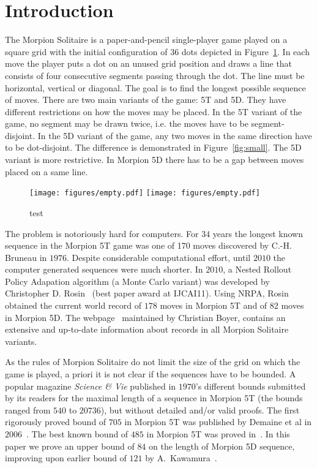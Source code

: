 \documentclass[a4paper,UKenglish]{lipics}
\begin{document}
\section{Introduction}
The Morpion Solitaire is a paper-and-pencil single-player game played on a square grid with 
  the initial configuration of 36 dots depicted in Figure~\ref{fig:initial}. 
In each move the player puts a dot on an unused grid position and draws a line that 
  consists of four consecutive segments passing through the dot. 
The line must be horizontal, vertical or diagonal. 
The goal is to find the longest possible sequence of moves.
There are two main variants of the game: 5T and 5D. 
They have different restrictions on how the moves may be placed.
In the 5T variant of the game, no segment may be drawn twice, i.e. the moves have to be segment-disjoint. 
In the 5D variant of the game, any two moves in the same direction have to be dot-disjoint.
The difference is demonstrated in Figure~\ref{fig:small}.
The 5D variant is more restrictive. In Morpion 5D there has to be a gap between moves
  placed on a same line.


  \begin{figure}
    \centering
      \texttt{[image: figures/empty.pdf]}
      \texttt{[image: figures/empty.pdf]}
      \caption{\label{fig:initial}
	test
      }
\end{figure}

The problem is notoriously hard for computers. 
For $34$ years the longest known sequence in the Morpion 5T game
  was one of 170 moves discovered by C.-H. Bruneau in $1976$. 
Despite considerable computational effort, until $2010$ the computer generated
  sequences were much shorter.
In $2010$, a Nested Rollout Policy Adapation algorithm (a Monte Carlo variant) 
  was developed by Christopher D. Rosin~\cite{rosin} (best paper award at IJCAI11).
Using NRPA, Rosin obtained the current world record of $178$ moves in Morpion 5T 
  and of $82$ moves in Morpion 5D.
The webpage~\cite{} maintained by Christian Boyer, contains an extensive and up-to-date information about records in all Morpion Solitaire variants.

As the rules of Morpion Solitaire do not limit the size of the grid on which the game is played, a priori
  it is not clear if the sequences have to be bounded.
A popular magazine \emph{Science \& Vie} published in $1970$'s different bounds submitted by its readers 
  for the maximal length of a sequence in Morpion 5T
  (the bounds ranged from $540$ to $20736$), but without detailed and/or valid proofs.
The first rigorously proved bound of $705$ in Morpion 5T was published by Demaine et al in $2006$~\cite{}.
The best known bound of $485$ in Morpion 5T was proved in~\cite{}.
In this paper we prove an upper bound of $84$ on the length of Morpion 5D sequence, improving upon earlier bound of $121$ by A.~Kawamura~\cite{}.
\end{document}
